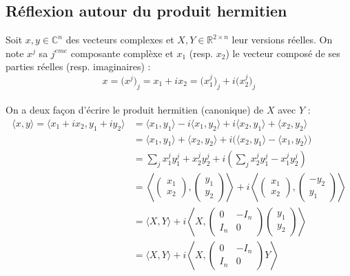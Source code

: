 \documentclass[hidelinks, french, oneside]{article}
\newcommand{\R}{\mathbb{R}}
\newcommand{\C}{\mathbb{C}}
\theoremstyle{enonce}
\theoremstyle{special}
\theoremstyle{rq}
\theoremstyle{exo}
\theoremstyle{demo}
\begin{document}
\subsection{Réflexion autour du produit hermitien}

Soit $x,y\in\C^n$ des vecteurs complexes et $X,Y\in\R^{2\times n}$ leur versions réelles. On note $x^j$ sa $j^{eme}$ composante complèxe et $x_1$ (resp. $x_2$) le vecteur composé de ses parties réelles (resp. imaginaires) :
\[x = \big(x^j\big)_j =  x_1 + ix_2 =  \big(x^j_1\big)_j +i \big(x^j_2\big)_j\]
\\
On a deux façon d'écrire le produit hermitien (canonique) de $X$ avec $Y$ :
\begin{align*}
\langle x,y \rangle = \langle x_1 + ix_2, y_1 + iy_2\rangle &= \langle x_1, y_1\rangle - i \langle x_1,y_2\rangle +i\langle x_2, y_1\rangle + \langle x_2, y_2\rangle  \\
	&= \langle x_1, y_1\rangle + \langle x_2, y_2\rangle 
		+ i\big(\langle x_2, y_1\rangle - \langle x_1,y_2\rangle\big) \\
	&= \sum_j x^j_1 y^j_1+ x^j_2 y^j_2
		+ i\left(\sum_j x^j_2 y^j_1 -  x^j_1y^j_2\right) \\
	&= \left\langle \begin{pmatrix} x_1 \\ x_2 \end{pmatrix},\begin{pmatrix} y_1 \\ y_2 \end{pmatrix}\right\rangle
		+ i\left\langle \begin{pmatrix} x_1 \\ x_2 \end{pmatrix},\begin{pmatrix} -y_2 \\ y_1 \end{pmatrix}\right\rangle \\
		&= \Big\langle X,Y\Big\rangle 
		+ i\left\langle X,\begin{pmatrix} 0 & -I_n \\ I_n & 0 \end{pmatrix}\begin{pmatrix} y_1 \\ y_2 \end{pmatrix}\right\rangle\\
	&= \Big\langle X,Y\Big\rangle 
		+ i\left\langle X,\begin{pmatrix} 0 & -I_n \\ I_n & 0 \end{pmatrix}Y\right\rangle
\end{align*}
\end{document}
